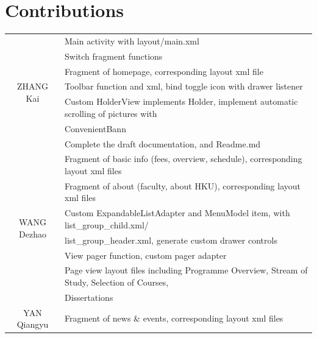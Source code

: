 \documentclass{article}
\begin{document}
 


    
    \section{Contributions}

    \begin{table}[h]
        \centering
        \begin{tabular}{|c|l|}
            \hline
            \multirow{7}{*}{ZHANG Kai} &  Main activity with layout/main.xml\\
            \cline{2-2}
            &Switch fragment functions \\
            \cline{2-2}
            &Fragment of homepage, corresponding layout xml file \\
            \cline{2-2}
            &Toolbar function and xml, bind toggle icon with drawer listener \\
            \cline{2-2}
            & Custom HolderView implements Holder, 
            implement automatic scrolling of pictures with\\
            & ConvenientBann\\
            \cline{2-2}
            &Complete the draft documentation, and Readme.md \\
            \hline
            \multirow{7}{*}{WANG Dezhao} &  
            Fragment of basic info (fees, overview, schedule), 
            corresponding layout xml files\\
            \cline{2-2}
            & Fragment of about (faculty, about HKU), 
            corresponding layout xml files \\
            \cline{2-2}
            & Custom ExpandableListAdapter and MenuModel item, 
            with list\_group\_child.xml/ \\
            & list\_group\_header.xml,
             generate custom drawer controls \\
            \cline{2-2}
            & View pager function, custom pager adapter \\
            \cline{2-2}
            & Page view layout files including Programme Overview, 
            Stream of Study, Selection of Courses, \\
            & Dissertations \\
            \hline
            \multirow{7}{*}{YAN Qiangyu} &  
            Fragment of news \& events, corresponding layout xml files\\
            \cline{2-2}

\end{tabular}
\end{table}
\end{document}

